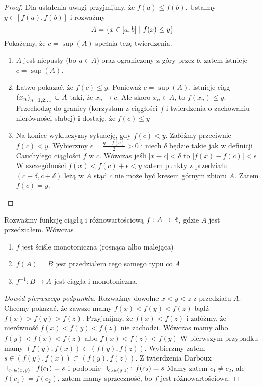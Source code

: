\documentclass[9pt]{article}
\begin{document}
\begin{proof}
    Dla ustalenia uwagi przyjmijmy, że $f(a) \le f(b)$. Ustalmy $y \in [f(a), f(b)]$ i rozważmy
    \[
        A = \left\{x \in [a,b] \ |\  f(x) \le y\right\}
    \]
    Pokażemy, że $c = \sup(A)$ spełnia tezę twierdzenia.
    \begin{enumerate}
        \item $A$ jest niepusty (bo $a \in A$) oraz ograniczony z góry przez $b$, zatem istnieje
            $c = \sup(A)$.
        \item Łatwo pokazać, że $f(c) \le y$. Ponieważ $c = \sup(A)$, istnieje ciąg
            $\left(x_n\right)_{n = 1,2,...} \subset A$ taki, że $x_n \to c$. Ale skoro $x_n \in A$, to $f(x_n) \le y$.
            Przechodzę do granicy (korzystam z ciągłości $f$ i twierdzenia o zachowaniu nierówności
            słabej) i dostaję, że $f(c) \le y$
        \item Na koniec wykluczymy sytuację, gdy $f(c) < y$. Załóżmy przeciwnie $f(c) < y$.
            Wybierzmy $\epsilon = \frac{g-f(c)}{2} > 0$ i niech $\delta$ będzie takie jak w
            definicji Cauchy`ego ciągłości $f$ w $c$. Wówczas jeśli
            $\left|x - c\right| < \delta$ to $\left|f(x) - f(c)\right| < \epsilon$
            W szczególności $f(x) < f(c) + \epsilon < y$
            zatem punkty z przedziału $(c-\delta, c+\delta)$ leżą w $A$ stąd $c$ nie może być kresem
            górnym zbioru $A$. Zatem $f(c) = y$.
    \end{enumerate}
\end{proof}

\begin{Twi}
    Rozważmy funkcję ciągłą i różnowartościową $f: A \to \mathbb{R}$, gdzie $A$ jest przedziałem. Wówczas
    \begin{enumerate}
        \item $f$ jest ściśle monotoniczna (rosnąca albo malejąca)
        \item $f(A)$ = $B$ jest przedziałem tego samego typu co $A$
        \item $f^{-1}: B \to A$ jest ciągła i monotoniczna.
    \end{enumerate}
\end{Twi}

\begin{proof}[Dowód pierwszego podpunktu]
    Rozważmy dowolne $x < y < z$ z przedziału $A$. Chcemy pokazać, że zawsze mamy
    $f(x) < f(y) < f(z)$
    bądź
    $f(x) > f(y) > f(z)$.
    Przyjmijmy, że $f(x) < f(z)$ i załóżmy, że nierówność
    $f(x) < f(y) < f(z)$
    nie zachodzi. Wówczas mamy albo
    $f(y) < f(x) < f(z)$
    albo
    $f(x) < f(z) < f(y)$
    W pierwszym przypadku mamy $\left(f(y), f(x)\right) \subset \left(f(y), f(z)\right)$. Wybierzmy
    zatem $s \in \left(f(y), f(x)\right) \subset \left(f(y), f(z)\right)$. Z twierdzenia Darboux
    $\exists_{c_1 \in (x, y)} \! : \, f(c_1) = s$
    i podobnie
    $\exists_{c_2 \in (y, z)} \! : \, f(c_2) = s$
    Mamy zatem $c_1 \ne c_2$, ale $f(c_1) = f(c_2)$, zatem mamy sprzeczność, bo $f$ jest
    różnowartościowa.
\end{proof}
\end{document}
